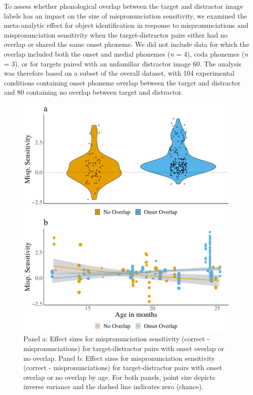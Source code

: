 \documentclass[man]{apa6}
\begin{document}
To assess whether phonological overlap between the target and distractor image labels has an impact on the size of mispronunciation sensitivity, we examined the meta-analytic effect for object identification in response to mispronunciations and mispronunciation sensitivity when the target-distractor pairs either had no overlap or shared the same onset phoneme. We did not include data for which the overlap included both the onset and medial phonemes (\emph{n} = 4), coda phonemes (\emph{n} = 3), or for targets paired with an unfamiliar distractor image 60. The analysis was therefore based on a subset of the overall dataset, with 104 experimental conditions containing onset phoneme overlap between the target and distractor and 80 containing no overlap between target and distractor.

\begin{figure}
\centering
\includegraphics{VonHolzenBergmann_MPMetaAnalysis_files/figure-latex/PlotDistOverlap-1.pdf}
\caption{\label{fig:PlotDistOverlap}Panel a: Effect sizes for mispronunciation sensitivity (correct - mispronunciations) for target-distractor pairs with onset overlap or no overlap. Panel b: Effect sizes for mispronunciation sensitivity (correct - mispronunciations) for target-distractor pairs with onset overlap or no overlap by age. For both panels, point size depicts inverse variance and the dashed line indicates zero (chance).}
\end{figure}
\end{document}
